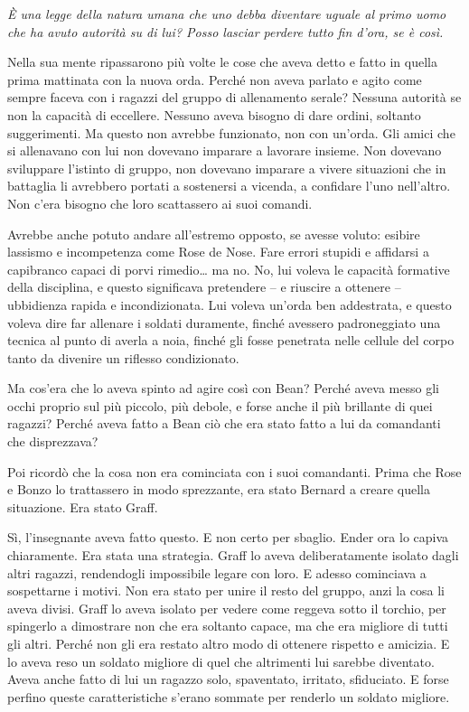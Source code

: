 \emph{{È una legge della natura umana che uno debba diventare uguale al
		primo uomo che ha avuto autorità su di lui? Posso lasciar perdere tutto
		fin d'ora, se è così.}}

{Nella sua mente ripassarono più volte le cose che aveva detto e fatto
	in quella prima mattinata con la nuova orda. Perché non aveva parlato e
	agito come sempre faceva con i ragazzi del gruppo di allenamento serale?
	Nessuna autorità se non la capacità di eccellere. Nessuno aveva bisogno
	di dare ordini, soltanto suggerimenti. Ma questo non avrebbe funzionato,
	non con un'orda. Gli amici che si allenavano con lui non dovevano
	imparare a lavorare insieme. Non dovevano sviluppare l'istinto di
	gruppo, non dovevano imparare a vivere situazioni che in battaglia li
	avrebbero portati a sostenersi a vicenda, a confidare l'uno nell'altro.
	Non c'era bisogno che loro scattassero ai suoi comandi.}

{Avrebbe anche potuto andare all'estremo opposto, se avesse voluto:
	esibire lassismo e incompetenza come Rose de Nose. Fare errori stupidi e
	affidarsi a capibranco capaci di porvi rimedio\ldots{} ma no. No, lui
	voleva le capacità formative della disciplina, e questo significava
	pretendere -- e riuscire a ottenere -- ubbidienza rapida e
	incondizionata. Lui voleva un'orda ben addestrata, e questo voleva dire
	far allenare i soldati duramente, finché avessero padroneggiato una
	tecnica al punto di averla a noia, finché gli fosse penetrata nelle
	cellule del corpo tanto da divenire un riflesso condizionato.}

{Ma cos'era che lo aveva spinto ad agire così con Bean? Perché aveva
	messo gli occhi proprio sul più piccolo, più debole, e forse anche il
	più brillante di quei ragazzi? Perché aveva fatto a Bean ciò che era
	stato fatto a lui da comandanti che disprezzava?}

{Poi ricordò che la cosa non era cominciata con i suoi comandanti. Prima
	che Rose e Bonzo lo trattassero in modo sprezzante, era stato Bernard a
	creare quella situazione. Era stato Graff.}

{Sì, l'insegnante aveva fatto questo. E non certo per sbaglio. Ender ora
	lo capiva chiaramente. Era stata una strategia. Graff lo aveva
	deliberatamente isolato dagli altri ragazzi, rendendogli impossibile
	legare con loro. E adesso cominciava a sospettarne i motivi. Non era
	stato per unire il resto del gruppo, anzi la cosa li aveva divisi. Graff
	lo aveva isolato per vedere come reggeva sotto il torchio, per spingerlo
	a dimostrare non che era soltanto capace, ma che era migliore di tutti
	gli altri. Perché non gli era restato altro modo di ottenere rispetto e
	amicizia. E lo aveva reso un soldato migliore di quel che altrimenti lui
	sarebbe diventato. Aveva anche fatto di lui un ragazzo solo, spaventato,
	irritato, sfiduciato. E forse perfino queste caratteristiche s'erano
	sommate per renderlo un soldato migliore.}

